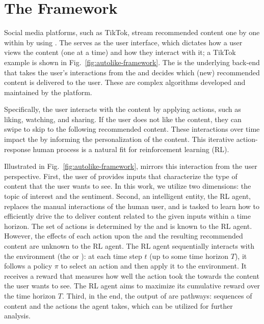 \section{The \autolike{} Framework}
\label{sec:autolike-framework}

Social media platforms, such as TikTok, stream recommended content one by one within \fyp{} by using \rs{}. The \fyp{} serves as the user interface, which dictates how a user views the content (one at a time) and how they interact with it; a TikTok example is shown in Fig.~\ref{fig:autolike-framework}.
The \rs{} is the underlying back-end that takes the user's interactions from the \fyp{} and decides which (new) recommended content is delivered to the user. These \rs{} are complex algorithms developed and maintained by the platform.

Specifically, the user interacts with the content by applying actions, such as liking, watching, and sharing. If the user does not like the content, they can swipe to skip to the following recommended content. 
These interactions over time impact the \rs{} by informing the personalization of the content. This iterative action-response human process is a natural fit for reinforcement learning (RL).

Illustrated in Fig.~\ref{fig:autolike-framework}, \autolike{} mirrors this interaction from the user perspective. First, the user of \autolike{} provides inputs that characterize the type of content that the user wants to see. In this work, we utilize two dimensions: the topic of interest and the sentiment. Second, an intelligent entity, the RL agent, replaces the manual interactions of the human user,
and is tasked to learn how to efficiently drive the \rs{} to deliver content related to the given inputs within a time horizon. 
The set of actions is determined by the \fyp{} and is known to the RL agent. 
However, the effects of each action upon the \rs{} and the resulting recommended content are unknown to the RL agent.
The RL agent sequentially interacts with the environment (the \rs{} or \fyp{}): at each time step $t$ (up to some time horizon $T$), it follows a policy $\pi$ to select an action and then apply it to the environment. It receives a reward that measures how well the action took the \rs{} towards the content the user wants to see. 
The RL agent aims to maximize its cumulative reward over the time horizon $T$. Third, in the end, the output of \autolike{} are pathways: sequences of content and the actions the agent takes, which can be utilized for further analysis.



